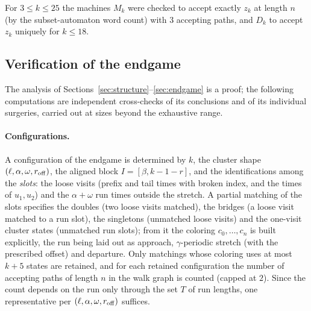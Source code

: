 \documentclass[11pt]{article}
\theoremstyle{definition}
\begin{document}
For $3\le k\le 25$ the machines $M_k$ were checked to accept exactly
$z_k$ at length $n$ (by the subset-automaton word count) with $3$
accepting paths, and $D_k$ to accept $z_k$ uniquely for $k\le18$.

\subsection{Verification of the endgame}

The analysis of Sections~\ref{sec:structure}--\ref{sec:endgame} is a proof;
the following computations are independent cross-checks of its conclusions
and of its individual surgeries, carried out at sizes beyond the exhaustive
range.

\paragraph{Configurations.}
A configuration of the endgame is determined by $k$, the cluster shape
$(\ell,\alpha,\omega,r_{\rm off})$, the aligned block $I=[\beta,k-1-r]$, and
the identifications among the \emph{slots}: the loose visits (prefix and
tail times with broken index, and the times of $u_1,u_2$) and the
$\alpha+\omega$ run times outside the stretch. A partial matching of the slots
specifies the doubles (two loose visits matched), the bridges (a loose visit
matched to a run slot), the singletons (unmatched loose visits) and the
one-visit cluster states (unmatched run slots); from it the coloring
$c_0,\dots,c_n$ is built explicitly, the run being laid out as approach,
$\gamma$-periodic stretch (with the prescribed offset) and departure. Only
matchings whose coloring uses at most $k+5$ states are retained, and for each
retained configuration the number of accepting paths of length $n$ in the
walk graph is counted (capped at $2$). Since the count depends on the run
only through the set $T$ of run lengths, one representative per
$(\ell,\alpha,\omega,r_{\rm off})$ suffices.
\end{document}
